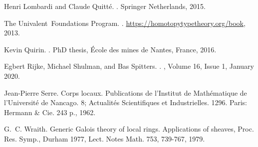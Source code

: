 \documentclass[10pt,a4paper]{article}
\theoremstyle{definition}
\begin{document}
\begin{thebibliography}{10}
Henri Lombardi and Claude Quitt{\'{e}}.
.
\newblock Springer Netherlands, 2015.

The Univalent~Foundations Program.
.
\newblock \url{https://homotopytypetheory.org/book}, 2013.

Kevin Quirin.
.
\newblock PhD thesis, {\'{E}}cole des mines de Nantes, France, 2016.

Egbert Rijke, Michael Shulman, and Bas Spitters.
.
, {Volume 16, Issue 1},
  January 2020.

Jean-Pierre Serre.
\newblock Corps locaux.
\newblock Publications de l'{Institut} de {Math{\'e}matique} de
  l'{Universit{\'e}} de {Nancago}. 8; {Actualit{\'e}s} {Scientifiques} et
  {Industrielles}. 1296. {Paris}: {Hermann} \& {Cie}. 243 p., 1962.

G.~C. Wraith.
\newblock Generic {Galois} theory of local rings.
\newblock Applications of sheaves, {Proc}. {Res}. {Symp}., {Durham} 1977,
  {Lect}. {Notes} {Math}. 753, 739-767, 1979.

\end{thebibliography}
\end{document}
